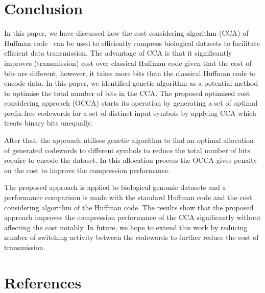 \documentclass[preprint,12pt]{elsarticle}%
\begin{document}
\section{Conclusion}
\label{sec5}
In this paper, we have discussed how the cost considering  algorithm (CCA) of Huffman code~\cite{Kab14} can be used to efficiently compress  biological datasets to facilitate efficient data transmission. The advantage of CCA is that it significantly improves (transmission) cost over classical Huffman code given that the cost of bits are different, however, it takes more bits than the classical Huffman code to encode data. In this paper, we identified genetic algorithm as a potential method to optimise the total number of bits in the CCA. The proposed optimised cost considering approach (OCCA) starts its operation by generating a set of optimal prefix-free codewords for a set of distinct input symbols by applying CCA which treats binary bits unequally. 

 After that, the approach utilises genetic algorithm to find an optimal allocation of generated codewords to different symbols to reduce the total number of bits require to encode the dataset. In this allocation process the OCCA gives penalty on the cost to improve the compression performance.
 
The proposed approach is applied to biological genomic datasets and a performance comparison is made with the standard Huffman code and the cost considering algorithm of the Huffman code. The results show that the proposed approach improves the compression performance of the CCA significantly without affecting the cost notably. In future, we hope to extend this work by reducing number of switching activity between the codewords to further reduce the cost of transmission.







\section*{References}

\end{document}
